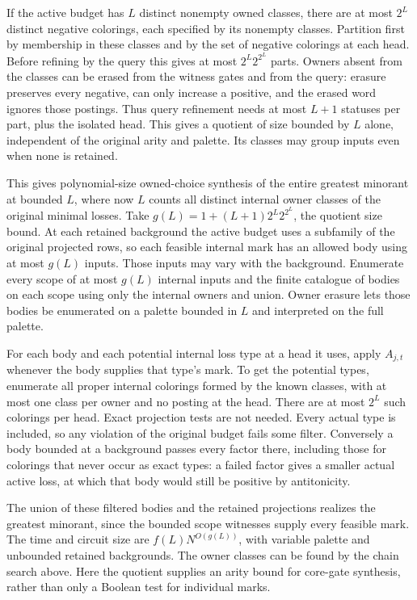 If the active budget has $L$ distinct
nonempty owned classes, there are at most
$2^L$ distinct negative colorings, each
specified by its nonempty classes.
Partition first by membership in these
classes and by the set of negative
colorings at each head. Before refining
by the query this gives at most
$2^L 2^{2^L}$ parts. Owners absent from
the classes can be erased from the
witness gates and from the query:
erasure preserves every negative, can
only increase a positive, and the erased
word ignores those postings. Thus query
refinement needs at most $L+1$ statuses
per part, plus the isolated head.
This gives a quotient of size bounded
by $L$ alone, independent of the
original arity and palette. Its classes
may group inputs even when none is
retained.

This gives polynomial-size owned-choice synthesis
of the entire greatest minorant at bounded $L$,
where now $L$ counts all distinct internal owner
classes of the original minimal losses. Take
$g(L)=1+(L+1)2^L2^{2^L}$, the quotient size bound.
At each retained background the active budget
uses a subfamily of the original projected rows,
so each feasible internal mark has an allowed
body using at most $g(L)$ inputs. Those inputs
may vary with the background. Enumerate every
scope of at most $g(L)$ internal inputs and the
finite catalogue of bodies on each scope using
only the internal owners and union. Owner
erasure lets those bodies be enumerated on a
palette bounded in $L$ and interpreted on the
full palette.

For each body and each potential internal
loss type at a head it uses, apply $A_{j,t}$
whenever the body supplies that type's
mark. To get the potential types, enumerate
all proper internal colorings formed by
the known classes, with at most one class
per owner and no posting at the head.
There are at most $2^L$ such colorings
per head. Exact projection tests are not
needed. Every actual type is included,
so any violation of the original budget
fails some filter. Conversely a body
bounded at a background passes every
factor there, including those for
colorings that never occur as exact
types: a failed factor gives a smaller
actual active loss, at which that body
would still be positive by antitonicity.

The union of these filtered bodies and
the retained projections realizes the
greatest minorant, since the bounded
scope witnesses supply every feasible
mark. The time and circuit size are
$f(L)N^{O(g(L))}$, with variable palette
and unbounded retained backgrounds.
The owner classes can be found by the
chain search above. Here the quotient
supplies an arity bound for core-gate
synthesis, rather than only a Boolean
test for individual marks.

